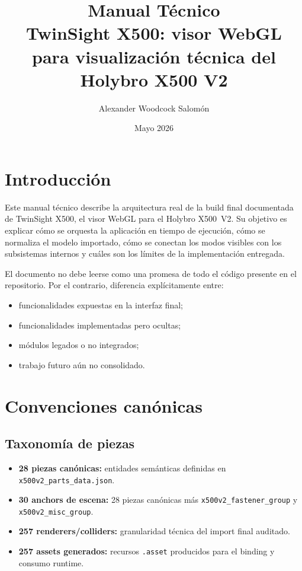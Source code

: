 \documentclass[12pt,letterpaper]{article}
\title{\textbf{Manual Técnico}\\TwinSight X500: visor WebGL para visualización técnica del Holybro X500 V2}
\author{Alexander Woodcock Salomón}
\date{Mayo 2026}
\begin{document}
\maketitle
\tableofcontents
\newpage

\section{Introducción}
Este manual técnico describe la arquitectura real de la build final documentada de TwinSight X500, el visor WebGL para el Holybro X500~V2. Su objetivo es explicar cómo se orquesta la aplicación en tiempo de ejecución, cómo se normaliza el modelo importado, cómo se conectan los modos visibles con los subsistemas internos y cuáles son los límites de la implementación entregada.

El documento no debe leerse como una promesa de todo el código presente en el repositorio. Por el contrario, diferencia explícitamente entre:
\begin{itemize}
    \item funcionalidades expuestas en la interfaz final;
    \item funcionalidades implementadas pero ocultas;
    \item módulos legados o no integrados;
    \item trabajo futuro aún no consolidado.
\end{itemize}

\section{Convenciones canónicas}

\subsection{Taxonomía de piezas}
\begin{itemize}
    \item \textbf{28 piezas canónicas:} entidades semánticas definidas en \texttt{x500v2\_parts\_data.json}.
    \item \textbf{30 anchors de escena:} 28 piezas canónicas más \texttt{x500v2\_fastener\_group} y \texttt{x500v2\_misc\_group}.
    \item \textbf{257 renderers/colliders:} granularidad técnica del import final auditado.
    \item \textbf{257 assets generados:} recursos \texttt{.asset} producidos para el binding y consumo runtime.
\end{itemize}
\end{document}
